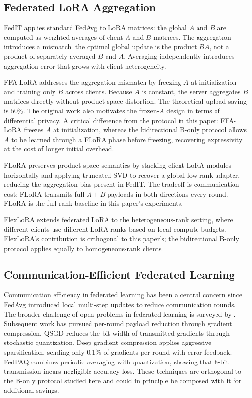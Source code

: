 \subsection{Federated LoRA Aggregation}
FedIT \citep{zhang2024federatedgpt} applies standard FedAvg \citep{mcmahan2017communication} to LoRA matrices: the global $A$ and $B$ are computed as weighted averages of client $A$ and $B$ matrices. The aggregation introduces a mismatch: the optimal global update is the product $BA$, not a product of separately averaged $B$ and $A$. Averaging independently introduces aggregation error that grows with client heterogeneity.

FFA-LoRA \citep{sun2024ffalora} addresses the aggregation mismatch by freezing $A$ at initialization and training only $B$ across clients. Because $A$ is constant, the server aggregates $B$ matrices directly without product-space distortion. The theoretical upload saving is 50\%. The original work also motivates the frozen-$A$ design in terms of differential privacy. A critical difference from the protocol in this paper: FFA-LoRA freezes $A$ at initialization, whereas the bidirectional B-only protocol allows $A$ to be learned through a FLoRA phase before freezing, recovering expressivity at the cost of longer initial overhead.

FLoRA \citep{wang2024flora} preserves product-space semantics by stacking client LoRA modules horizontally and applying truncated SVD to recover a global low-rank adapter, reducing the aggregation bias present in FedIT. The tradeoff is communication cost: FLoRA transmits full $A{+}B$ payloads in both directions every round. FLoRA is the full-rank baseline in this paper's experiments.

FlexLoRA \citep{bai2024flexlora} extends federated LoRA to the heterogeneous-rank setting, where different clients use different LoRA ranks based on local compute budgets. FlexLoRA's contribution is orthogonal to this paper's; the bidirectional B-only protocol applies equally to homogeneous-rank clients.

\subsection{Communication-Efficient Federated Learning}
Communication efficiency in federated learning has been a central concern since FedAvg \citep{mcmahan2017communication} introduced local multi-step updates to reduce communication rounds. The broader challenge of open problems in federated learning is surveyed by \citet{kairouz2021advances}. Subsequent work has pursued per-round payload reduction through gradient compression. QSGD \citep{alistarh2017qsgd} reduces the bit-width of transmitted gradients through stochastic quantization. Deep gradient compression \citep{lin2017deep} applies aggressive sparsification, sending only 0.1\% of gradients per round with error feedback. FedPAQ \citep{reisizadeh2020fedpaq} combines periodic averaging with quantization, showing that 8-bit transmission incurs negligible accuracy loss. These techniques are orthogonal to the B-only protocol studied here and could in principle be composed with it for additional savings.

